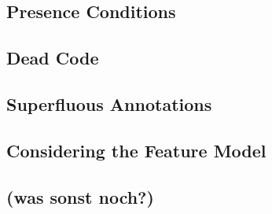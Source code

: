 \subsection{Presence Conditions}

\subsection{Dead Code}

\subsection{Superfluous Annotations}

\subsection{Considering the Feature Model}

\subsection{(was sonst noch?)}